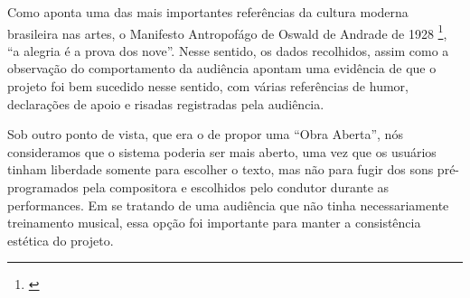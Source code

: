 
Como aponta uma das mais importantes referências da cultura moderna brasileira nas artes, o Manifesto Antropofágo de Oswald de Andrade de 1928 \footnote{\cite{Andrade1928}}, ``a alegria é a prova dos nove''. Nesse sentido, os dados recolhidos, assim como a observação do comportamento da audiência apontam uma evidência de que o projeto foi bem sucedido nesse sentido, com várias referências de humor, declarações de apoio e risadas registradas pela audiência. 


Sob outro ponto de vista, que era o de propor uma ``Obra Aberta'', nós consideramos que o sistema poderia ser mais aberto, uma vez que os usuários tinham liberdade somente para escolher o texto, mas não para fugir dos sons pré-programados pela compositora e escolhidos pelo condutor durante as performances. Em se tratando de uma audiência que não tinha necessariamente treinamento musical, essa opção foi importante para manter a consistência estética do projeto.




